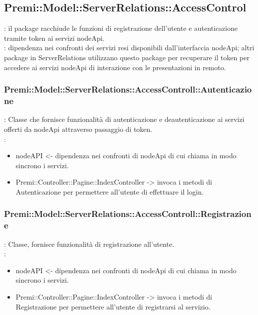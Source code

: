 \subsection{Premi::Model::ServerRelations::AccessControl}{
		\textbf{\tipo}: il package racchiude le funzioni di registrazione dell’utente e autenticazione tramite token ai servizi nodeApi.\\
		\textbf{\relaz}: dipendenza nei confronti dei servizi resi disponibili dall’interfaccia nodeApi; altri package in ServerRelations utilizzano questo package per recuperare il token per accedere ai servizi nodeApi di interazione con le presentazioni in remoto.\\
        \subsubsection{Premi::Model::ServerRelations::AccessControll::Autenticazione}{
				\textbf{\tipo}: Classe che fornisce funzionalità di autenticazione e deautenticazione ai servizi offerti da nodeApi attraverso passaggio di token.\\	
				\textbf{\relaz}: 
				\begin{itemize}
					\item nodeAPI <- dipendenza nei confronti di nodeApi di cui chiama in modo sincrono i servizi.
                    \item Premi::Controller::Pagine::IndexController -> invoca i metodi di Autenticazione per permettere all'utente di effettuare il login.
				\end{itemize}	
                    }
        \subsubsection{Premi::Model::ServerRelations::AccessControll::Registrazione}{
				\textbf{\tipo}: Classe, fornisce funzionalità di registrazione all’utente.\\	
				\textbf{\relaz}: 
				\begin{itemize}
					\item nodeAPI <- dipendenza nei confronti di nodeApi di cui chiama in modo sincrono i servizi.
                    \item Premi::Controller::Pagine::IndexController -> invoca i metodi di Registrazione per permettere all'utente di registrarsi al servizio.
				\end{itemize}	
            }
}

